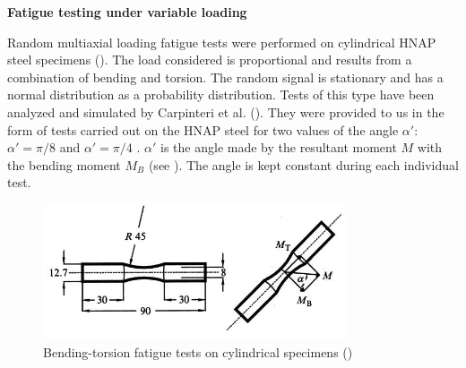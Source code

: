\noindent
\vspace{6pt}
\textbf{Fatigue testing under variable loading}
\vspace{6pt}

Random multiaxial loading fatigue tests were performed on cylindrical HNAP steel specimens (\cite{ACHTELIC1994}). The load considered is proportional and results from a combination of bending and torsion. The random signal is stationary and has a normal distribution as a probability distribution. Tests of this type have been analyzed and simulated by Carpinteri et al. (\cite{carpinteri2003multiaxial}). They were provided to us in the form of tests carried out on the HNAP steel for two values of the angle $\alpha'$: $\alpha' = \pi / 8$ and $\alpha' = \pi / 4$ . $\alpha' $ is the angle made by the resultant moment $M$ with the bending moment $M_B$ (see ). The angle is kept constant during each individual test. 

\begin{figure}[!h]
\centering
\includegraphics[width=0.8\textwidth]{figures//10HNAPsample.png} 
\caption{Bending-torsion fatigue tests on cylindrical specimens (\cite{carpinteri2003multiaxial})}
\label{fig.10HNAPsample}
\end{figure}

